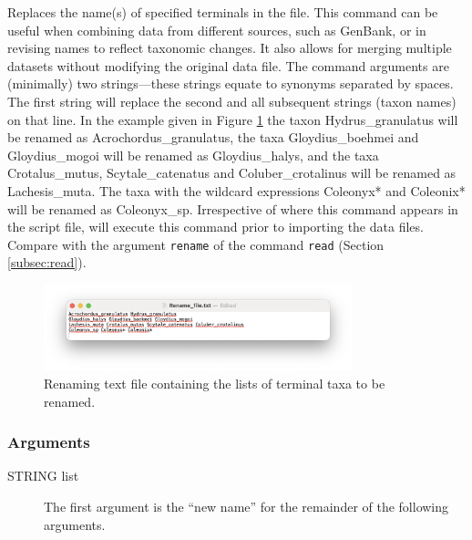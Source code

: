 	\begin{phygdescription}
	{Replaces the name(s) of specified terminals in the file. This command can be useful 
	when combining data from different sources, such as GenBank, or in revising names 
	to reflect taxonomic changes. It also allows for merging multiple datasets without 
	modifying the original data file. The command arguments are (minimally) two 
	strings---these strings equate to synonyms separated by spaces. The first string 
	will replace the second and all subsequent strings (taxon names) on that line. In the 
	example given in Figure \ref{renamefile} the taxon Hydrus\_granulatus will be renamed 
	as Acrochordus\_granulatus, the taxa Gloydius\_boehmei and Gloydius\_mogoi will be 
	renamed as Gloydius\_halys, and the taxa Crotalus\_mutus, Scytale\_catenatus and 
	Coluber\_crotalinus will be renamed as Lachesis\_muta. The taxa with the wildcard 
	expressions Coleonyx* and Coleonix* will be renamed as Coleonyx\_sp. Irrespective 
	of where this command appears in the script file, \phyg will execute this command prior 
	to importing the data files. Compare with the argument \texttt{rename} of the command 
	\texttt{read} (Section \ref{subsec:read}).
	
		\begin{figure}[H]
		\centering
		\includegraphics[width=0.8\textwidth]{Rename_file.jpg}
		\caption{Renaming text file containing the lists of terminal taxa to be renamed.}
		\label{renamefile}
		\end{figure}
		}
	\end{phygdescription}
	
	\subsubsection{Arguments}
	
	\begin{description}
	
		\item [STRING list]  The first argument is the ``new name'' for the remainder of the 
		following arguments.
		
	\end{description}
		
